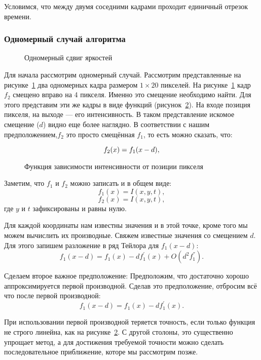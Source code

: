 Условимся, что между двумя соседними кадрами проходит единичный отрезок времени.
\subsubsection{Одномерный случай алгоритма}

\begin{figure}[ht]
\caption{Одномерный сдвиг яркостей}
\label{pic:math_1}
\end{figure}

Для начала рассмотрим одномерный случай. Рассмотрим представленные на рисунке~\ref{pic:math_1} два одномерных кадра размером $1 \times 20$ пикселей. На рисунке~\ref{pic:math_1} кадр $f_2$ смещено вправо на 4 пикселя. Именно это смещение необходимо найти. Для этого представим эти же кадры в виде функций (рисунок~\ref{pic:math_2}). На входе позиция пикселя, на выходе — его интенсивность. В таком представление искомое смещение ($d$) видно еще более наглядно. В соответствии с нашим предположением,$f_2$ это просто смещённая $f_1$, то есть можно сказать, что:

\begin{equation}
\numberwithin{equation}{section}
\label{eq:f_2}
f_2(x)=f_1(x-d),
\end{equation}
\begin{figure}[ht]
\caption{Функция зависимости интенсивности от позиции пикселя}
\label{pic:math_2}
\end{figure}

Заметим, что $f_1$ и $f_2$ можно записать и в общем виде: 
$$f_1(x)=I(x,y,t),$$
$$f_2(x)=I(x,y,t),$$
где $y$ и $t$ зафиксированы и равны нулю.

Для каждой координаты нам известны значения и в этой точке, кроме того мы можем вычислить их производные. Свяжем известные значения со смещением $d$. Для этого запишем разложение в ряд Тейлора для $f_1(x-d)$:
$$f_1(x-d)=f_1(x)-df^{'}_1(x)+O(d^2f^{''}_1).$$

Сделаем второе важное предположение: Предположим, что достаточно хорошо аппроксимируется первой производной. Сделав это предположение, отбросим всё что после первой производной:
$$f_1(x-d)=f_1(x)-df_1^{'}(x).$$

При использовании первой производной теряется точность, если только функция не строго линейна, как на рисунке~\ref{pic:math_2}. С другой столоны, это существенно упрощает метод, а для достижения требуемой точности можно сделать последовательное приближение, которе мы рассмотрим позже.

